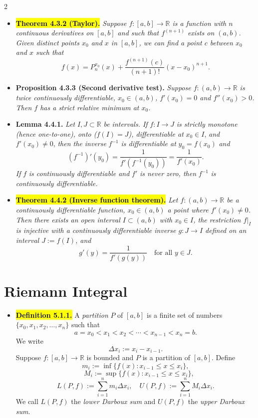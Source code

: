 \documentclass[a4paper,10pt]{article}
\begin{document}
\begin{multicols}{2}
\begin{itemize}
    \[
    P_n^{x_0}(x) := \sum_{k=0}^{n} \frac{f^{(k)}(x_0)}{k!}(x - x_0)^k
    \]
    \item \hl{\textbf{Theorem 4.3.2 (Taylor).}} \textit{
    Suppose \( f : [a, b] \to \mathbb{R} \) is a function with \( n \) continuous derivatives on \( [a, b] \) and such that \( f^{(n+1)} \) exists on \( (a, b) \). Given distinct points \( x_0 \) and \( x \) in \( [a, b] \), we can find a point \( c \) between \( x_0 \) and \( x \) such that
    \[
    f(x) = P_n^{x_0}(x) + \frac{f^{(n+1)}(c)}{(n+1)!}(x - x_0)^{n+1}.
    \]
    }
    \item \textbf{Proposition 4.3.3 (Second derivative test).} \textit{
    Suppose \( f : (a, b) \to \mathbb{R} \) is twice continuously differentiable, \( x_0 \in (a, b) \), \( f'(x_0) = 0 \) and \( f''(x_0) > 0 \). Then \( f \) has a strict relative minimum at \( x_0 \).}
    \item \textbf{Lemma 4.4.1.}
    \textit{Let } $I, J \subset \mathbb{R}$ \textit{ be intervals. If } $f : I \to J$ \textit{ is strictly monotone (hence one-to-one), onto (}$f(I) = J$\textit{), differentiable at } $x_0 \in I$, \textit{and } $f'(x_0) \neq 0$, \textit{then the inverse } $f^{-1}$ \textit{ is differentiable at } $y_0 = f(x_0)$ \textit{ and}
    \[
    (f^{-1})'(y_0) = \frac{1}{f'(f^{-1}(y_0))} = \frac{1}{f'(x_0)}.
    \]    
    \textit{If } $f$ \textit{ is continuously differentiable and } $f'$ \textit{ is never zero, then } $f^{-1}$ \textit{ is continuously differentiable.}
    \item \hl{\textbf{Theorem 4.4.2 (Inverse function theorem).}}
    \textit{
    Let $f : (a, b) \to \mathbb{R}$ be a continuously differentiable function, $x_0 \in (a, b)$ a point where $f'(x_0) \neq 0$. Then there exists an open interval $I \subset (a, b)$ with $x_0 \in I$, the restriction $f|_I$ is injective with a continuously differentiable inverse $g : J \to I$ defined on an interval $J := f(I)$, and
    \[
    g'(y) = \frac{1}{f'(g(y))} \quad \text{for all } y \in J.
    \]
    }
    

\end{itemize}

\section*{Riemann Integral}
\begin{itemize}
    \item \hl{\textbf{Definition 5.1.1.}} A \textit{partition} \( P \) of \( [a, b] \) is a finite set of numbers \( \{ x_0, x_1, x_2, \ldots, x_n \} \) such that
    \[
    a = x_0 < x_1 < x_2 < \cdots < x_{n-1} < x_n = b.
    \]    
    We write
    \[
    \Delta x_i := x_i - x_{i-1}.
    \]    
    Suppose \( f : [a, b] \to \mathbb{R} \) is bounded and \( P \) is a partition of \( [a, b] \). Define
    \[
    m_i := \inf \{ f(x) : x_{i-1} \le x \le x_i \},\]\[ \quad M_i := \sup \{ f(x) : x_{i-1} \le x \le x_i \},
    \]
    \[
    L(P, f) := \sum_{i=1}^n m_i \Delta x_i, \quad U(P, f) := \sum_{i=1}^n M_i \Delta x_i.
    \]  
    We call \( L(P, f) \) the \textit{lower Darboux sum} and \( U(P, f) \) the \textit{upper Darboux sum}.


\end{itemize}
\end{multicols}
\end{document}
